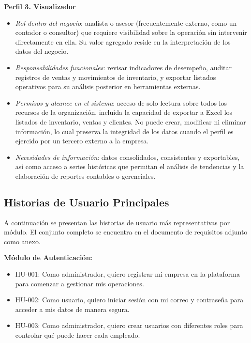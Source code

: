 \textbf{Perfil 3. Visualizador}

\begin{itemize}
\tightlist
\item
  \emph{Rol dentro del negocio}: analista o asesor (frecuentemente externo, como un contador o consultor) que requiere visibilidad sobre la operación sin intervenir directamente en ella. Su valor agregado reside en la interpretación de los datos del negocio.
\item
  \emph{Responsabilidades funcionales}: revisar indicadores de desempeño, auditar registros de ventas y movimientos de inventario, y exportar listados operativos para su análisis posterior en herramientas externas.
\item
  \emph{Permisos y alcance en el sistema}: acceso de solo lectura sobre todos los recursos de la organización, incluida la capacidad de exportar a Excel los listados de inventario, ventas y clientes. No puede crear, modificar ni eliminar información, lo cual preserva la integridad de los datos cuando el perfil es ejercido por un tercero externo a la empresa.
\item
  \emph{Necesidades de información}: datos consolidados, consistentes y exportables, así como acceso a series históricas que permitan el análisis de tendencias y la elaboración de reportes contables o gerenciales.
\end{itemize}

\subsection{Historias de Usuario Principales}\label{historias-de-usuario-principales}

A continuación se presentan las historias de usuario más representativas por módulo. El conjunto completo se encuentra en el documento de requisitos adjunto como anexo.

\textbf{Módulo de Autenticación:}

\begin{itemize}
\tightlist
\item
  HU-001: Como administrador, quiero registrar mi empresa en la plataforma para comenzar a gestionar mis operaciones.
\item
  HU-002: Como usuario, quiero iniciar sesión con mi correo y contraseña para acceder a mis datos de manera segura.
\item
  HU-003: Como administrador, quiero crear usuarios con diferentes roles para controlar qué puede hacer cada empleado.
\end{itemize}

